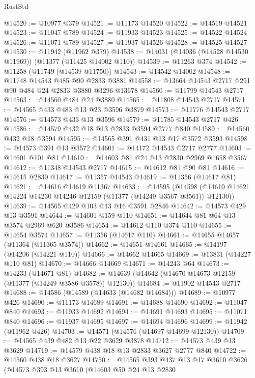 \begin{lexlean}{RustStd}
\begin{coremodule}
{\begin{coremodule}
{{{{{{{{{{{{{{{{{{{{{{{{{{{{{{{{{@14520 := @10977 @379
@14521 := @11173 @14520
@14522 := @14519 @14521
@14523 := @11047 @789
@14524 := @11933 @14523
@14525 := @14522 @14524
@14526 := @11071 @789
@14527 := @11937 @14526
@14528 := @14525 @14527
@14530 := @11942 (@11962 @379)
@14538 := @14031 (@14036 (@14528 @14530 @11969)) (@11377 (@11425 @14002 @110))
@14539 := @11263 @374
@14542 := @11258 (@11749 (@14539 @11750))
@14543 := @14542 @14002
@14548 := @11748 @14543 @485 @90 @2833 @3881
@14558 := @13664 @14543 @2717 @291 @90 @484 @24 @2833 @3880 @3296 @13678
@14560 := @11799 @14543 @2717
@14563 := @14560 @484 @24 @3880
@14565 := @11808 @14543 @2717
@14571 := @14565 @433 @483 @13 @23 @3596 @3879
@14573 := @11776 @14543 @2717
@14576 := @14573 @433 @13 @3596
@14579 := @11785 @14543 @2717 @426
@14586 := @14579 @432 @18 @13 @2833 @3594 @2777 @840
@14589 := @14560 @432 @18 @3594
@14595 := @14565 @391 @431 @13 @17 @3572 @3593
@14598 := @14573 @391 @13 @3572
@14601 := @14172 @14543 @2717 @2777
@14603 := @14601 @101 @81
@14610 := @14603 @81 @24 @13 @2830 @2969 @1658 @3567
@14612 := @11348 @14543 @2717
@14615 := @14612 @81 @90 @81
@14616 := @14615 @2830
@14617 := @11357 @14543
@14619 := @11356 (@14617 @81)
@14621 := @14616 @14619 @11367
@14633 := @14595
    (@14598 (@14610 @14621 @14224 @14230 @14246 @12159 (@11377 (@14249 @3567 @3561)) @12130))
@14639 := @14565 @429 @103 @13 @16 @3591 @2846
@14642 := @14573 @429 @13 @3591
@14644 := @14601 @159 @110
@14651 := @14644 @81 @64 @13 @3574 @2969 @620 @3586
@14654 := @14612 @110 @374 @110
@14655 := @14654 @3574
@14657 := @11356 (@14617 @110)
@14661 := @14655 @14657 (@11364 (@11365 @3574))
@14662 := @14651 @14661
@14665 := @14197 (@14206 (@14221 @110))
@14666 := @14662 @14665
@14669 := @13831 (@14227 @110 @81)
@14670 := @14666 @14669
@14671 := @14243 @64
@14673 := @14233 (@14671 @81)
@14682 := @14639 (@14642 (@14670 @14673 @12159 (@11377 (@14249 @3586 @3578)) @12130))
@14684 := @11902 @14543 @2717
@14688 := @14586 (@14589 (@14633 (@14682 @14684)))
@14689 := @10977 @426
@14690 := @11173 @14689
@14691 := @14688 @14690
@14692 := @11047 @840
@14693 := @11933 @14692
@14694 := @14691 @14693
@14695 := @11071 @840
@14696 := @11937 @14695
@14697 := @14694 @14696
@14699 := @11942 (@11962 @426)
@14703 := @14571 (@14576 (@14697 @14699 @12130))
@14709 := @14565 @439 @482 @13 @22 @3629 @3878
@14712 := @14573 @439 @13 @3629
@14719 := @14579 @438 @18 @13 @2833 @3627 @2777 @840
@14722 := @14560 @438 @18 @3627
@14750 := @14565
    @393
    @437
    @13
    @17
    @3610
    @3626
    (@14573
      @393
      @13
      @3610
      (@14603
        @50
        @24
        @13
        @2830
}}}}}}}}}}}}}}}}}}}}}}}}}}}}}}}}}
\end{coremodule}}
\end{coremodule}
\end{lexlean}
